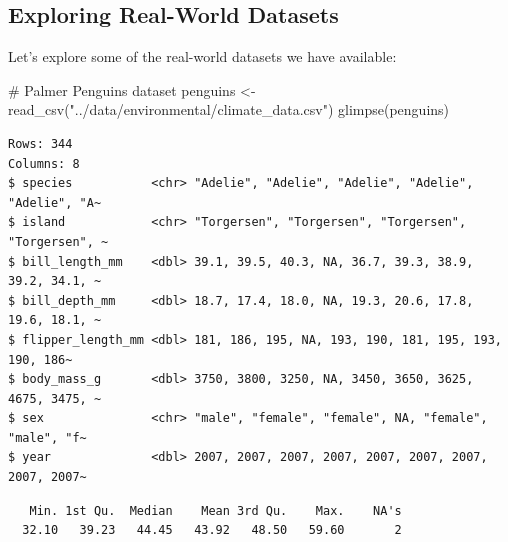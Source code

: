 \documentclass[
  letterpaper,
]{book}
\newenvironment{Shaded}{\begin{snugshade}}{\end{snugshade}}
\newcommand{\CommentTok}[1]{\textcolor[rgb]{0.37,0.37,0.37}{#1}}
\newcommand{\FunctionTok}[1]{\textcolor[rgb]{0.28,0.35,0.67}{#1}}
\newcommand{\NormalTok}[1]{\textcolor[rgb]{0.00,0.23,0.31}{#1}}
\newcommand{\OtherTok}[1]{\textcolor[rgb]{0.00,0.23,0.31}{#1}}
\newcommand{\SpecialCharTok}[1]{\textcolor[rgb]{0.37,0.37,0.37}{#1}}
\newcommand{\StringTok}[1]{\textcolor[rgb]{0.13,0.47,0.30}{#1}}
\begin{document}
\subsection{Exploring Real-World
Datasets}\label{exploring-real-world-datasets}

Let's explore some of the real-world datasets we have available:

\begin{Shaded}
\begin{Highlighting}[]
\CommentTok{\# Palmer Penguins dataset}
\NormalTok{penguins }\OtherTok{\textless{}{-}} \FunctionTok{read\_csv}\NormalTok{(}\StringTok{"../data/environmental/climate\_data.csv"}\NormalTok{)}
\FunctionTok{glimpse}\NormalTok{(penguins)}
\end{Highlighting}
\end{Shaded}

\begin{verbatim}
Rows: 344
Columns: 8
$ species           <chr> "Adelie", "Adelie", "Adelie", "Adelie", "Adelie", "A~
$ island            <chr> "Torgersen", "Torgersen", "Torgersen", "Torgersen", ~
$ bill_length_mm    <dbl> 39.1, 39.5, 40.3, NA, 36.7, 39.3, 38.9, 39.2, 34.1, ~
$ bill_depth_mm     <dbl> 18.7, 17.4, 18.0, NA, 19.3, 20.6, 17.8, 19.6, 18.1, ~
$ flipper_length_mm <dbl> 181, 186, 195, NA, 193, 190, 181, 195, 193, 190, 186~
$ body_mass_g       <dbl> 3750, 3800, 3250, NA, 3450, 3650, 3625, 4675, 3475, ~
$ sex               <chr> "male", "female", "female", NA, "female", "male", "f~
$ year              <dbl> 2007, 2007, 2007, 2007, 2007, 2007, 2007, 2007, 2007~
\end{verbatim}

\begin{Shaded}
\end{Shaded}

\begin{verbatim}
   Min. 1st Qu.  Median    Mean 3rd Qu.    Max.    NA's 
  32.10   39.23   44.45   43.92   48.50   59.60       2 
\end{verbatim}

\begin{Shaded}
\end{Shaded}
\end{document}
